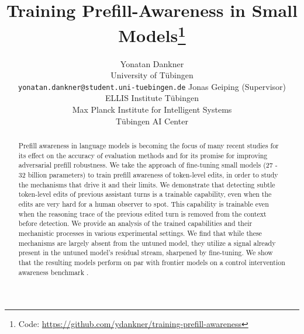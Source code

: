 \documentclass{article}
\title{Training Prefill-Awareness in Small Models\thanks{Code: \url{https://github.com/ydankner/training-prefill-awareness}}}
\author{Yonatan Dankner \\
University of T\"ubingen \\
\texttt{yonatan.dankner@student.uni-tuebingen.de}
\AND
Jonas Geiping \textmd{(Supervisor)} \\
ELLIS Institute T\"ubingen \\
Max Planck Institute for Intelligent Systems \\
T\"ubingen AI Center
}
\begin{document}
\maketitle
{}

\begin{abstract}
Prefill awareness in language models is becoming the focus of many recent studies for its effect on the accuracy of evaluation methods and for its promise for improving adversarial prefill robustness. We take the approach of fine-tuning small models (27 - 32 billion parameters) to train prefill awareness of token-level edits, in order to study the mechanisms that drive it and their limits. We demonstrate that detecting subtle token-level edits of previous assistant turns is a trainable capability, even when the edits are very hard for a human observer to spot. This capability is trainable even when the reasoning trace of the previous edited turn is removed from the context before detection. We provide an analysis of the trained capabilities and their mechanistic processes in various experimental settings. We find that while these mechanisms are largely absent from the untuned model, they utilize a signal already present in the untuned model's residual stream, sharpened by fine-tuning. We show that the resulting models perform on par with frontier models on a control intervention awareness benchmark \citep{schaeffer2026ciaware}.
\end{abstract}










\newpage
\appendix

\end{document}
